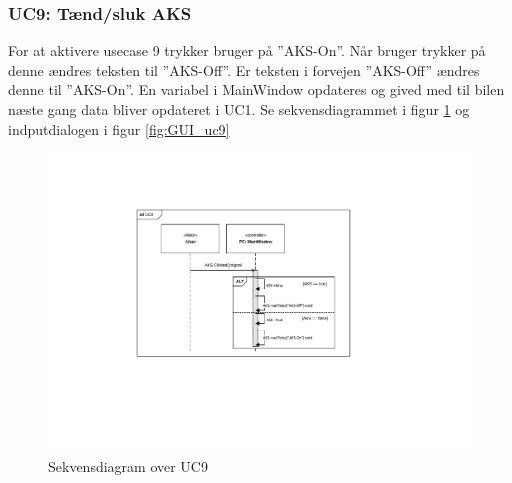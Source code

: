 \subsubsection{UC9: Tænd/sluk AKS}
For at aktivere usecase 9 trykker bruger på ''AKS-On''.
Når bruger trykker på denne ændres teksten til ''AKS-Off''. Er teksten i forvejen ''AKS-Off'' ændres denne til ''AKS-On''. En variabel i MainWindow opdateres og gived med til bilen næste gang data bliver opdateret i UC1. Se sekvensdiagrammet i figur \ref{fig:cd_uc9} og indputdialogen i figur \ref{fig:GUI_uc9}

\begin{figure}[H]
\centering
\includegraphics[width=\textwidth* 2/3,height=\textwidth* 4/10 ]{../fig/diagrammer/pc/sd_uc9.pdf}
\caption{Sekvensdiagram over UC9}
\label{fig:cd_uc9}
\end{figure}

